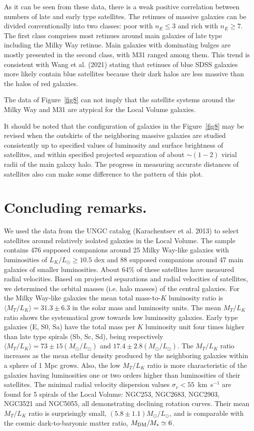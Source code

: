\documentclass[proof]{WileyASNA-v1}
\begin{document}
As it can be seen from these data, there is a weak positive correlation between
numbers of late and early type satellites. The retinues of massive galaxies can
be divided conventionally into two classes: poor with $n_E\leq3$ and rich with
$n_E\geq7$. The first class comprises most retinues around main galaxies of late
type including the Milky Way retinue. Main galaxies with dominating bulges are
mostly presented in the second class, with M31 ranged among them. This trend is
consistent with Wang et al. (2021) stating that retinues of blue SDSS galaxies
more likely contain blue satellites because their dark halos are less massive
than the halos of red galaxies.

The data of Figure~\ref{fig8} can not imply that the satellite systems around
the Milky Way and M31 are atypical for the Local Volume galaxies.

It should be noted that the configuration of galaxies in the Figure~\ref{fig8}
may be revised when the outskirts of the neighboring massive galaxies are
studied consistently up to specified values of luminosity and surface brightness
of satellites, and within specified projected separation of about $\sim(1-2)$
virial radii of the main galaxy halo. The progress in measuring accurate
distances of satellites also can make some difference to the pattern of this
plot.

\section{Concluding remarks.}\label{sec6}

We used the data from the UNGC catalog (Karachentsev et al. 2013) to select
satellites around relatively isolated galaxies in the Local Volume. The sample
contains 476 supposed companions around 25 Milky Way-like galaxies with
luminosities of $L_K/L_{\odot}\geq10.5$ dex and 88 supposed companions around 47
main galaxies of smaller luminosities. About 64\% of these satellites have
measured radial velocities. Based on projected separations and radial velocities
of satellites, we determined the orbital masses (i.e. halo masses) of the
central galaxies. For the Milky Way-like galaxies the mean total mass-to-$K$
luminosity ratio is $\langle M_T/L_K\rangle=31.3\pm6.3$ in the solar mass and
luminosity units. The mean $M_T/L_K$ ratio shows the systematical grow towards
low luminosity galaxies. Early type galaxies (E, S0, Sa) have the total mass per
$K$ luminosity unit four times higher than late type spirals (Sb, Sc, Sd), being
respectively $\langle M_T/L_K\rangle=73\pm15(M_{\odot} / L_{\odot})$ and
$17.4\pm2.8(M_{\odot}/L_{\odot})$. The $M_T/L_K$ ratio increases as the mean
stellar density produced by the neighboring galaxies within a sphere of 1 Mpc
grows. Also, the low $M_T/L_K$ ratio is more characteristic of the galaxies
having luminosities one or two orders higher than luminosities of their
satellites. The minimal radial velocity dispersion values $\sigma_v <
55$~km~s$^{-1}$ are found for 5 spirals of the Local Volume: NGC253, NGC2683,
NGC2903, NGC3521 and NGC5055, all demonstrating declining rotation curves. Their
mean $M_T/L_K$ ratio is surprisingly small, $(5.8\pm1.1)M_{\odot}/L_{\odot}$,
and is comparable with the cosmic dark-to-baryonic matter ratio, $M_{\rm DM}/M_*
\simeq6$.
\end{document}
